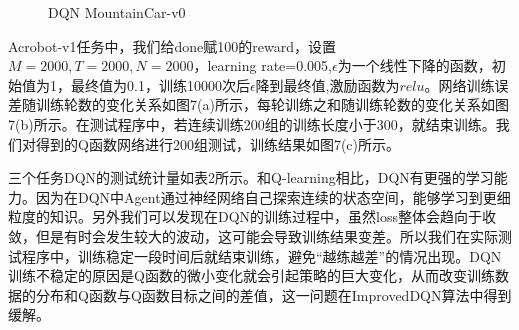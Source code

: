 \documentclass[a4paper,UTF8]{article}
\theoremstyle{definition}
\begin{document}
\begin{figure}[!h]
	\centering
	\caption{DQN MountainCar-v0}

\end{figure}

	Acrobot-v1任务中，我们给done赋100的reward，设置$M=2000,T=2000,N=2000$，learning rate=0.005,$\epsilon$为一个线性下降的函数，初始值为1，最终值为0.1，训练10000次后$\epsilon$降到最终值,激励函数为$relu$。网络训练误差随训练轮数的变化关系如图7(a)所示，每轮训练之和随训练轮数的变化关系如图7(b)所示。在测试程序中，若连续训练200组的训练长度小于300，就结束训练。我们对得到的Q函数网络进行200组测试，训练结果如图7(c)所示。
	
	三个任务DQN的测试统计量如表2所示。和Q-learning相比，DQN有更强的学习能力。因为在DQN中Agent通过神经网络自己探索连续的状态空间，能够学习到更细粒度的知识。另外我们可以发现在DQN的训练过程中，虽然loss整体会趋向于收敛，但是有时会发生较大的波动，这可能会导致训练结果变差。所以我们在实际测试程序中，训练稳定一段时间后就结束训练，避免“越练越差”的情况出现。DQN训练不稳定的原因是Q函数的微小变化就会引起策略的巨大变化，从而改变训练数据的分布和Q函数与Q函数目标之间的差值，这一问题在ImprovedDQN算法中得到缓解。
\end{document}
